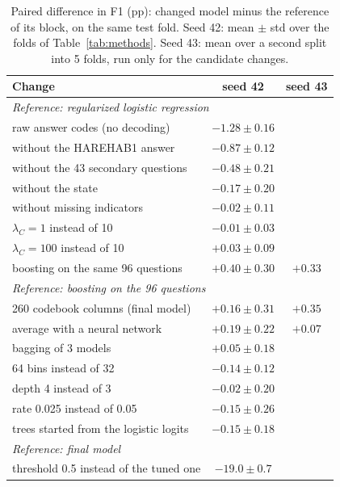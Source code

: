 \documentclass[10pt,conference,compsocconf]{IEEEtran}
\begin{document}
\begin{table}[tbp]
  \centering\footnotesize\setlength{\tabcolsep}{4pt}
  \begin{tabular}{|l|c|c|}
    \hline
    Change & seed 42 & seed 43 \\
    \hline
    \multicolumn{3}{|l|}{\textit{Reference: regularized logistic regression}} \\
    raw answer codes (no decoding) & $-1.28 \pm 0.16$ & \\
    without the HAREHAB1 answer & $-0.87 \pm 0.12$ & \\
    without the 43 secondary questions & $-0.48 \pm 0.21$ & \\
    without the state & $-0.17 \pm 0.20$ & \\
    without missing indicators & $-0.02 \pm 0.11$ & \\
    $\lambda_C = 1$ instead of 10 & $-0.01 \pm 0.03$ & \\
    $\lambda_C = 100$ instead of 10 & $+0.03 \pm 0.09$ & \\
    boosting on the same 96 questions & $+0.40 \pm 0.30$ & $+0.33$ \\
    \hline
    \multicolumn{3}{|l|}{\textit{Reference: boosting on the 96 questions}} \\
    260 codebook columns (final model) & $+0.16 \pm 0.31$ & $+0.35$ \\
    average with a neural network & $+0.19 \pm 0.22$ & $+0.07$ \\
    bagging of 3 models & $+0.05 \pm 0.18$ & \\
    64 bins instead of 32 & $-0.14 \pm 0.12$ & \\
    depth 4 instead of 3 & $-0.02 \pm 0.20$ & \\
    rate 0.025 instead of 0.05 & $-0.15 \pm 0.26$ & \\
    trees started from the logistic logits & $-0.15 \pm 0.18$ & \\
    \hline
    \multicolumn{3}{|l|}{\textit{Reference: final model}} \\
    threshold 0.5 instead of the tuned one & $-19.0 \pm 0.7$ & \\
    \hline
  \end{tabular}
  \caption{Paired difference in F1 (pp): changed model minus the reference of
    its block, on the same test fold. Seed 42: mean $\pm$ std over the folds of
    Table~\ref{tab:methods}. Seed 43: mean over a second split into 5 folds, run
    only for the candidate changes.}
  \label{tab:ablation}
\end{table}
\end{document}
